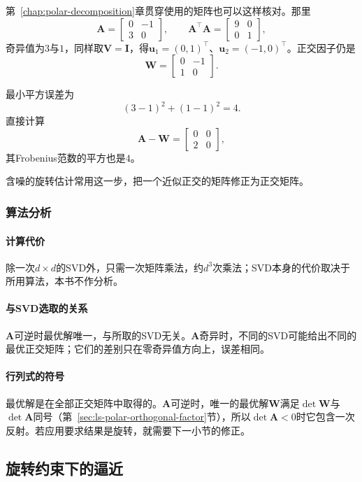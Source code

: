 第~\ref{chap:polar-decomposition}章贯穿使用的矩阵也可以这样核对。那里
\[
 \bm A=\begin{bmatrix}0&-1\\3&0\end{bmatrix},\qquad
 \bm A^\top\bm A=\begin{bmatrix}9&0\\0&1\end{bmatrix},
\]
奇异值为$3$与$1$，同样取$\bm V=\bm I$，得$\bm u_1=(0,1)^\top$、$\bm u_2=(-1,0)^\top$。正交因子仍是
\[
 \bm W=\begin{bmatrix}0&-1\\1&0\end{bmatrix}.
\]

最小平方误差为
\[
 (3-1)^2+(1-1)^2=4 .
\]
直接计算
\[
 \bm A-\bm W=\begin{bmatrix}0&0\\2&0\end{bmatrix},
\]
其Frobenius范数的平方也是$4$。

含噪的旋转估计常用这一步，把一个近似正交的矩阵修正为正交矩阵。

\subsubsection{算法分析}

\paragraph{计算代价}
除一次$d\times d$的SVD外，只需一次矩阵乘法，约$d^3$次乘法；SVD本身的代价取决于所用算法，本书不作分析。

\paragraph{与SVD选取的关系}
$\bm A$可逆时最优解唯一，与所取的SVD无关。$\bm A$奇异时，不同的SVD可能给出不同的最优正交矩阵；它们的差别只在零奇异值方向上，误差相同。

\paragraph{行列式的符号}
最优解是在全部正交矩阵中取得的。$\bm A$可逆时，唯一的最优解$\bm W$满足$\det\bm W$与$\det\bm A$同号（第~\ref{sec:ls-polar-orthogonal-factor}节），所以$\det\bm A<0$时它包含一次反射。若应用要求结果是旋转，就需要下一小节的修正。

\subsection{旋转约束下的逼近}
\label{sec:matrix-approximation-rotation}


